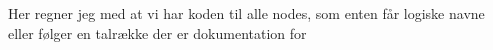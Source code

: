 Her regner jeg med at vi har koden til alle nodes, som enten får logiske navne eller følger en talrække der er dokumentation for